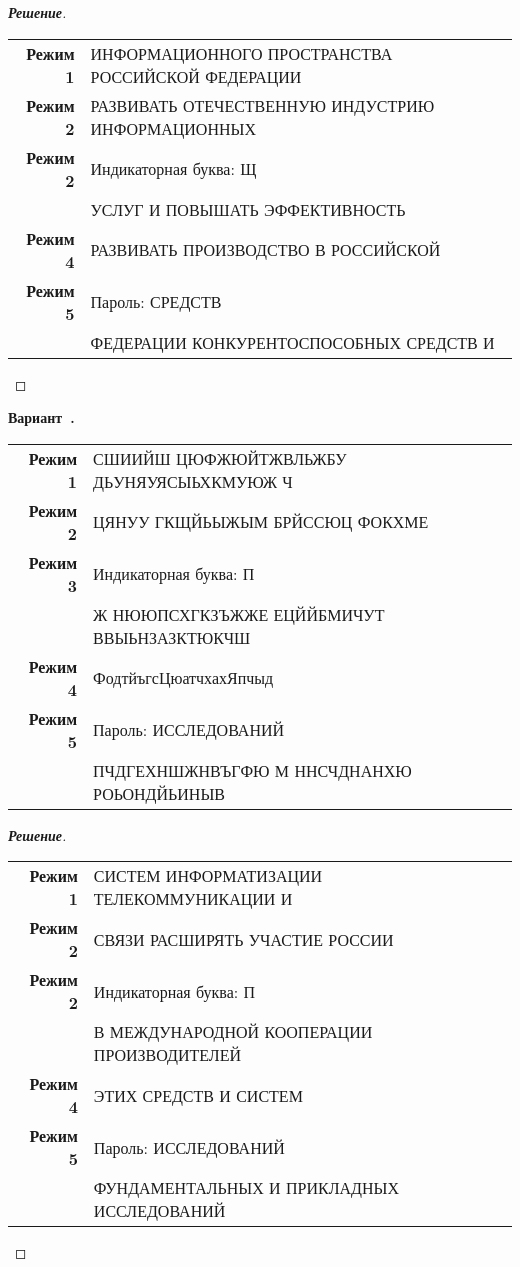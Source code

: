 \documentclass[a4paper,14pt]{extarticle}
\newcounter{exercise}[section]
\newenvironment{exercise}[1][]{\refstepcounter{exercise}\par\medskip
   \noindent\textbf{Вариант~\theexercise. #1}\\
   \noindent\makebox[\linewidth]{\rule{\textwidth}{1.25pt}}
   }
{\vspace{-2.5px}\mbox{}\newline \noindent\makebox[\linewidth]{\rule{\textwidth}{.5pt}}
}
\newenvironment{solution}
{\begin{proof}[\textbf{\textit{Решение}}]}
  {\end{proof}}
\begin{document}
\begin{solution}
\begin{table}[H]
	\centering
	\begin{tabular}{r l}\textbf{Режим 1}  & ИНФОРМАЦИОННОГО ПРОСТРАНСТВА РОССИЙСКОЙ ФЕДЕРАЦИИ \\ 
\textbf{Режим 2}  & РАЗВИВАТЬ ОТЕЧЕСТВЕННУЮ ИНДУСТРИЮ ИНФОРМАЦИОННЫХ \\ 
\textbf{Режим 2}  & Индикаторная буква: Щ \\ 
& УСЛУГ И ПОВЫШАТЬ ЭФФЕКТИВНОСТЬ \\ 
\textbf{Режим 4}  & РАЗВИВАТЬ ПРОИЗВОДСТВО В РОССИЙСКОЙ \\ 
\textbf{Режим 5}  & Пароль: СРЕДСТВ \\ 
& ФЕДЕРАЦИИ КОНКУРЕНТОСПОСОБНЫХ СРЕДСТВ И \\ 
	\end{tabular} 
\end{table}

\end{solution}
\begin{exercise}\begin{table}[H]
	\centering
	\begin{tabular}{r l}\textbf{Режим 1}  & СШИИЙШ ЦЮФЖЮЙТЖВЛЬЖБУ ДЬУНЯУЯСЫЬХКМУЮЖ Ч \\ 
\textbf{Режим 2}  & ЦЯНУУ ГКЩЙЬЫЖЫМ БРЙССЮЦ ФОКХМЕ \\ 
\textbf{Режим 3}  & Индикаторная буква: П \\ 
& Ж НЮЮПСХГКЗЪЖЖЕ ЕЦЙЙБМИЧУТ ВВЫЬНЗАЗКТЮКЧШ \\ 
\textbf{Режим 4}  & ФодтйъгсЦюатчхахЯпчыд \\ 
\textbf{Режим 5}  & Пароль: ИССЛЕДОВАНИЙ \\ 
& ПЧДГЕХНШЖНВЪГФЮ М ННСЧДНАНХЮ РОЬОНДЙЬИНЫВ \\ 
	\end{tabular} 
\end{table}

\end{exercise}
\begin{solution}
\begin{table}[H]
	\centering
	\begin{tabular}{r l}\textbf{Режим 1}  & СИСТЕМ ИНФОРМАТИЗАЦИИ ТЕЛЕКОММУНИКАЦИИ И \\ 
\textbf{Режим 2}  & СВЯЗИ РАСШИРЯТЬ УЧАСТИЕ РОССИИ \\ 
\textbf{Режим 2}  & Индикаторная буква: П \\ 
& В МЕЖДУНАРОДНОЙ КООПЕРАЦИИ ПРОИЗВОДИТЕЛЕЙ \\ 
\textbf{Режим 4}  & ЭТИХ СРЕДСТВ И СИСТЕМ \\ 
\textbf{Режим 5}  & Пароль: ИССЛЕДОВАНИЙ \\ 
& ФУНДАМЕНТАЛЬНЫХ И ПРИКЛАДНЫХ ИССЛЕДОВАНИЙ \\ 
	\end{tabular} 
\end{table}

\end{solution}
\end{document}
